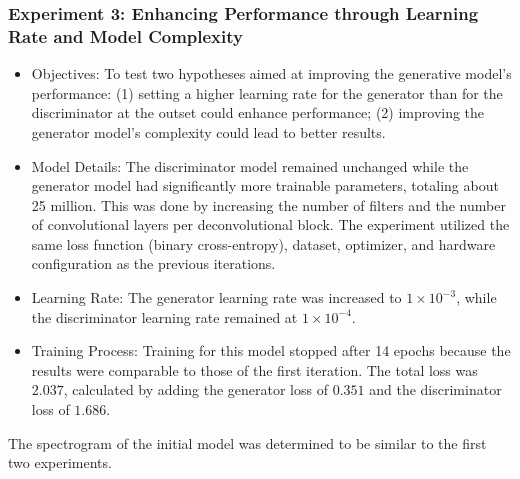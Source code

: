 \begin{frame}
    \frametitle{Experiment 3: Enhancing Performance through Learning Rate and Model Complexity}

    \begin{itemize}
        \item Objectives: To test two hypotheses aimed at improving the generative model's performance: (1) setting a higher learning rate for the generator than for the discriminator at the outset could enhance performance; (2) improving the generator model's complexity could lead to better results.
        \item Model Details: The discriminator model remained unchanged while the generator model had significantly more trainable parameters, totaling about 25 million. This was done by increasing the number of filters and the number of convolutional layers per deconvolutional block. The experiment utilized the same loss function (binary cross-entropy), dataset, optimizer, and hardware configuration as the previous iterations.
        \item Learning Rate: The generator learning rate was increased to $1 \times 10^{-3}$, while the discriminator learning rate remained at $1 \times 10^{-4}$.
        \item Training Process: Training for this model stopped after 14 epochs because the results were comparable to those of the first iteration. The total loss was $2.037$, calculated by adding the generator loss of $0.351$ and the discriminator loss of $1.686$.
    \end{itemize}

    The spectrogram of the initial model was determined to be similar to the first two experiments.
\end{frame}

